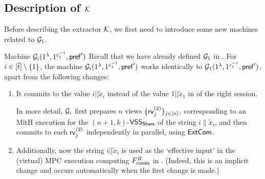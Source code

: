 
\subsection{Description of $\mathcal{K}$}
Before describing the extractor $\mathcal{K}$, we first need to introduce some new machines related to $\mathcal{G}_1$. 
\begin{AlgorithmBox}[label={algo:G:i}]{Machine \textnormal{$\mathcal{G}_i(1^\lambda, 1^{\varepsilon_1^{-1}}, \mathsf{pref}')$}}
 Recall that we have already defined $\mathcal{G}_1$ in . For $i \in [\widetilde{t}]\setminus \{1\}$, the machine $\mathcal{G}_i(1^\lambda, 1^{\varepsilon_1^{-1}}, \mathsf{pref}')$ works identically to $\mathcal{G}_1(1^\lambda, 1^{\varepsilon_1^{-1}}, \mathsf{pref}')$, apart from the following changes: 
\begin{enumerate}
\item It commits to the value $i||\tilde{x}_i$ instead of the value $1||\tilde{x}_1$ in  of the right session. 

In more detail, $\mathcal{G}_i$ first prepares $n$ views $\{\mathsf{rv}^{(2)}_j\}_{j \in [n]}$, corresponding to an MitH execution for the $(n+1, k)$-$\mathsf{VSS}_\mathsf{Share}$ of the string $i\|\tilde{x}_i$, and then commits to each $\mathsf{rv}^{(2)}_j$  independently in parallel, using $\mathsf{ExtCom}$. 

\item Additionally, now the string $i||\tilde{x}_i$ is used as the `effective input' in the (virtual) MPC execution computing $F^R_{\mathsf{consis}}$ in . (Indeed, this is an implicit change and occurs automatically when the first change is made.) 
\end{enumerate} 
\end{AlgorithmBox}


